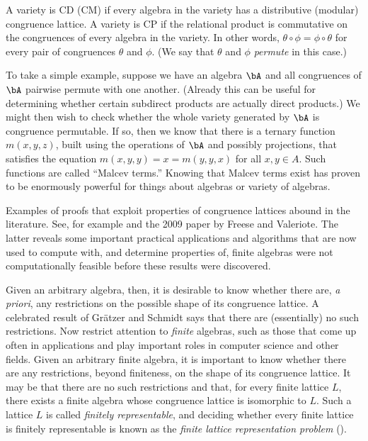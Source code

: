 A variety is CD (CM) if every algebra in the variety has a distributive
(modular) congruence lattice. A variety is CP if the relational product
is commutative on the congruences of every algebra in the variety.
In other words, 
$\theta \circ \phi = \phi \circ \theta$ for every pair of congruences
$\theta$ and $\phi$. (We say that
$\theta$ and $\phi$ \emph{permute} in this case.)

To take a simple example, suppose we have an algebra $\bA$ and all
congruences of $\bA$ pairwise permute with one another.
(Already this can be useful for determining whether certain subdirect products
are actually direct products.)
We might then wish to check whether the whole variety generated by
$\bA$ is congruence permutable. If so, then we know that there is a ternary
function $m(x,y,z)$, built using the operations of $\bA$ and possibly
projections, that satisfies the equation $m(x,y,y)=x = m(y,y,x)$
for all $x,y\in A$. Such functions are called ``Malcev terms.''
Knowing that Malcev terms exist has proven to be enormously powerful
for things about algebras or variety of algebras. 

Examples of proofs that exploit properties of congruence lattices abound in the
literature. See, for example \cite{MR3076179} and the
2009 paper by Freese and Valeriote. The latter reveals some important
practical applications and algorithms that are now used to compute with, and
determine properties of, finite algebras were not computationally feasible
before these results were discovered.

Given an arbitrary algebra, then, it is desirable to know whether there are, 
\emph{a priori}, any restrictions on the possible shape of its congruence
lattice.  A celebrated result of Gr\"{a}tzer and
Schmidt says that there are (essentially) no such
restrictions. 
Now restrict attention to \emph{finite} algebras, such as those that
come up often in applications and play important roles in computer science and
other fields.  
Given an arbitrary finite algebra, it is important to know  whether
there are any restrictions, beyond finiteness, on the shape of its congruence lattice.
It may be that there are no such restrictions and that, for every finite lattice $L$, there
exists a finite algebra whose congruence lattice is isomorphic to $L$.  
Such a lattice $L$ is called \emph{finitely representable}, and deciding whether every finite
lattice is finitely representable is known as the \emph{finite lattice
  representation problem} (\flrp).  


